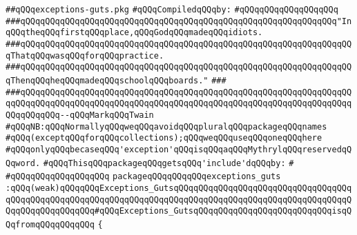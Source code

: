\label{src/lib/std/src/exceptions-guts.pkg}
\verb|##qQQqexceptions-guts.pkg|\newline
\newline
\verb|#qQQqCompiledqQQqby:|\newline
\verb|#qQQqqQQqqQQqqQQqqQQq|\newline
\newline
\verb|###qQQqqQQqqQQqqQQqqQQqqQQqqQQqqQQqqQQqqQQqqQQqqQQqqQQqqQQqqQQqqQQq"InqQQqtheqQQqfirstqQQqplace,qQQqGodqQQqmadeqQQqidiots.|\newline
\verb|###qQQqqQQqqQQqqQQqqQQqqQQqqQQqqQQqqQQqqQQqqQQqqQQqqQQqqQQqqQQqqQQqqQQqThatqQQqwasqQQqforqQQqpractice.|\newline
\verb|###qQQqqQQqqQQqqQQqqQQqqQQqqQQqqQQqqQQqqQQqqQQqqQQqqQQqqQQqqQQqqQQqqQQqThenqQQqheqQQqmadeqQQqschoolqQQqboards."|\newline
\verb|###|\newline
\verb|###qQQqqQQqqQQqqQQqqQQqqQQqqQQqqQQqqQQqqQQqqQQqqQQqqQQqqQQqqQQqqQQqqQQqqQQqqQQqqQQqqQQqqQQqqQQqqQQqqQQqqQQqqQQqqQQqqQQqqQQqqQQqqQQqqQQqqQQqqQQqqQQqqQQq--qQQqMarkqQQqTwain|\newline
\newline
\verb|#qQQqNB:qQQqNormallyqQQqweqQQqavoidqQQqpluralqQQqpackageqQQqnames|\newline
\verb|#qQQq(exceptqQQqforqQQqcollections);qQQqweqQQquseqQQqoneqQQqhere|\newline
\verb|#qQQqonlyqQQqbecaseqQQq'exception'qQQqisqQQqaqQQqMythrylqQQqreservedqQQqword.|\newline
\newline
\verb|#qQQqThisqQQqpackageqQQqgetsqQQq'include'dqQQqby:|\newline
\verb|#|\newline
\verb|#qQQqqQQqqQQqqQQqqQQq|\newline
\newline
\verb|packageqQQqqQQqqQQqexceptions_guts|\newline
\verb|:qQQq(weak)qQQqqQQqExceptions_GutsqQQqqQQqqQQqqQQqqQQqqQQqqQQqqQQqqQQqqQQqqQQqqQQqqQQqqQQqqQQqqQQqqQQqqQQqqQQqqQQqqQQqqQQqqQQqqQQqqQQqqQQqqQQqqQQqqQQqqQQqqQQq#qQQqExceptions_GutsqQQqqQQqqQQqqQQqqQQqqQQqqQQqisqQQqfromqQQqqQQqqQQq|\newline
\verb|{|\newline
